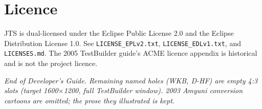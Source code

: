 \documentclass[11pt]{article}
\begin{document}

\section{Licence}
JTS is dual-licensed under the Eclipse Public License 2.0 and the
Eclipse Distribution License 1.0. See \texttt{LICENSE\_EPLv2.txt},
\texttt{LICENSE\_EDLv1.txt}, and \texttt{LICENSES.md}. The 2005
TestBuilder guide's ACME licence appendix is historical and is not
the project licence.

\vspace{1.2em}
\noindent\textit{End of Developer's Guide. Remaining named holes
(WKB, D-HF) are empty 4:3 slots (target 1600$\times$1200, full
TestBuilder window). 2003 Amyuni conversion cartoons are omitted;
the prose they illustrated is kept.}
\end{document}
